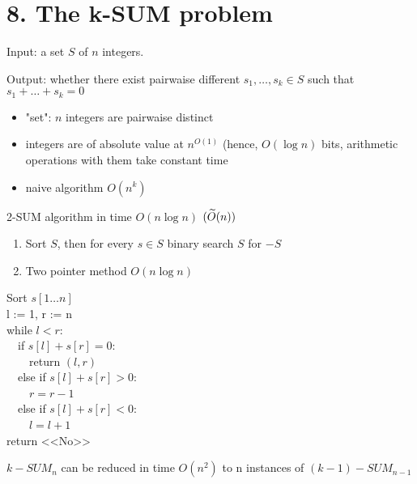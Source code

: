 \section{8. The k-SUM problem}

\begin{df}
	Input: a set $S$ of $n$ integers.

	Output: whether there exist pairwaise different $s_1, \ldots, s_k \in S$ such that $s_1 + \ldots + s_k = 0$

\end{df}

\begin{remrk}

	\begin{itemize}
		\item "set": $n$ integers are pairwaise distinct
		\item integers are of absolute value at $n^{O(1)}$ (hence, $O(\log n)$ bits, arithmetic operations with them take constant time
		\item naive algorithm $O(n^k)$
	\end{itemize}
\end{remrk}

\begin{thm}
	2-SUM algorithm in time $O(n \log n)$ $(\widetilde{O} (n))$
\end{thm}

\begin{algorithm}
	\begin{enumerate}
		\item Sort $S$, then for every $s \in S$ binary search $S $ for $-S $
		\item Two pointer method $O(n \log n)$
	\end{enumerate}
\end{algorithm}

Sort $s[1\ldots n]$ \\
l := 1, r := n \\
while $l < r$: \\
\ \ if $s[l] + s[r] = 0$: \\
\ \ \ \ return $(l, r)$ \\
\ \ else if $s[l] + s[r] > 0$: \\
\ \ \ \ $r = r - 1$ \\
\ \ else if $s[l] + s[r] < 0$: \\
\ \ \ \ $l = l + 1$  \\
return <<No>>

\begin{lm}
	$k-SUM_n$ can be reduced in time $O(n^2)$ to n instances of $(k - 1)-SUM_{n - 1}$
\end{lm}

